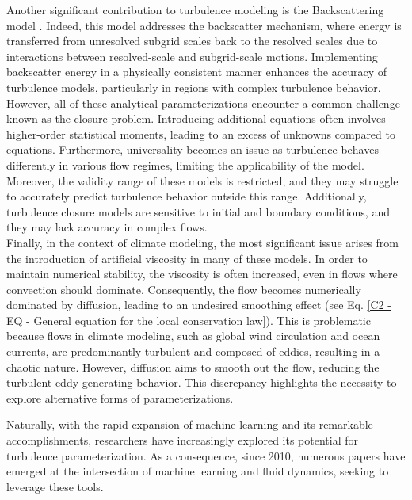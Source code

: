 Another significant contribution to turbulence modeling is the Backscattering model \citep{ClosureAnalytical51, ClosureAnalytical52}. Indeed, this model addresses the backscatter mechanism, where energy is transferred from unresolved subgrid scales back to the resolved scales due to interactions between resolved-scale and subgrid-scale motions. Implementing backscatter energy in a physically consistent manner enhances the accuracy of turbulence models, particularly in regions with complex turbulence behavior.\\

However, all of these analytical parameterizations encounter a common challenge known as the closure problem. Introducing additional equations often involves higher-order statistical moments, leading to an excess of unknowns compared to equations. Furthermore, universality becomes an issue as turbulence behaves differently in various flow regimes, limiting the applicability of the model. Moreover, the validity range of these models is restricted, and they may struggle to accurately predict turbulence behavior outside this range. Additionally, turbulence closure models are sensitive to initial and boundary conditions, and they may lack accuracy in complex flows.\\

Finally, in the context of climate modeling, the most significant issue arises from the introduction of artificial viscosity in many of these models. In order to maintain numerical stability, the viscosity is often increased, even in flows where convection should dominate. Consequently, the flow becomes numerically dominated by diffusion, leading to an undesired smoothing effect (see Eq. \ref{C2 - EQ - General equation for the local conservation law}). This is problematic because flows in climate modeling, such as global wind circulation and ocean currents, are predominantly turbulent and composed of eddies, resulting in a chaotic nature. However, diffusion aims to smooth out the flow, reducing the turbulent eddy-generating behavior. This discrepancy highlights the necessity to explore alternative forms of parameterizations.

\newpage

Naturally, with the rapid expansion of machine learning and its remarkable accomplishments, researchers have increasingly explored its potential for turbulence parameterization. As a consequence, since 2010, numerous papers have emerged at the intersection of machine learning and fluid dynamics, seeking to leverage these tools.\\

